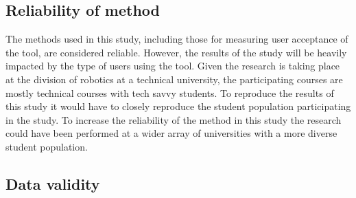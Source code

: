 \subsection{Reliability of method}
\label{sec:reliabilityOfMethod}




The methods used in this study, including those for measuring user acceptance of the tool, are considered reliable. However, the results of the study will be heavily impacted by the type of users using the tool. Given the research is taking place at the division of robotics at a technical university, the participating courses are mostly technical courses with tech savvy students. To reproduce the results of this study it would have to closely reproduce the student population participating in the study. To increase the reliability of the method in this study the research could have been performed at a wider array of universities with a more diverse student population.


\subsection{Data validity}
\label{sec:dataValidity}















